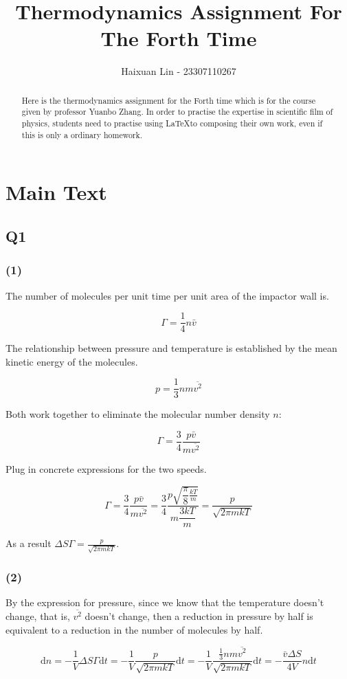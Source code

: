 \documentclass[a4paper,11pt]{amsart}
\title{Thermodynamics Assignment For The Forth Time}
\author{Haixuan Lin - 23307110267}
\theoremstyle{definition}
\begin{document}
	
	\begin{abstract}
		Here is the thermodynamics assignment for the Forth time which is for the course given by professor Yuanbo Zhang. In order to practise the expertise in scientific film of physics, students need to practise using \LaTeX to composing their own work, even if this is only a ordinary homework.
	\end{abstract}
	
	\maketitle
	
	\section*{Main Text}

	\subsection*{Q1}

	\subsubsection*{(1)}

	The number of molecules per unit time per unit area of the impactor wall is.

	$$
	\varGamma =\frac{1}{4}n\bar{v}
	$$
	
	The relationship between pressure and temperature is established by the mean kinetic energy of the molecules.

	$$
	p=\frac{1}{3}nm\overline{v^2}
	$$

	Both work together to eliminate the molecular number density $n$:

	$$
	\varGamma =\frac{3}{4}\frac{p\bar{v}}{m\overline{v^2}}
	$$

	Plug in concrete expressions for the two speeds.

	$$
	\varGamma =\dfrac{3}{4}\dfrac{p\bar{v}}{m\overline{v^2}}=\dfrac{3}{4}\dfrac{p\sqrt{\dfrac{\pi}{8}\frac{kT}{m}}}{m\dfrac{3kT}{m}}=\dfrac{p}{\sqrt{2\pi mkT}}
	$$

	As a result $\displaystyle\Delta S\varGamma=\frac{p}{\sqrt{2\pi mkT}}.$

	\subsubsection*{(2)}

	By the expression for pressure, since we know that the temperature doesn't change, that is, $\overline{v^2}$ doesn't change, then a reduction in pressure by half is equivalent to a reduction in the number of molecules by half.

	$$
	\mathrm{d}n=-\frac{1}{V}\Delta S\varGamma \mathrm{d}t=-\frac{1}{V}\frac{p}{\sqrt{2\pi mkT}}\mathrm{d}t=-\frac{1}{V}\frac{\frac{1}{3}nm\overline{v^2}}{\sqrt{2\pi mkT}}\mathrm{d}t=-\frac{\bar{v}\Delta S}{4V}n\mathrm{d}t
	$$
\end{document}
